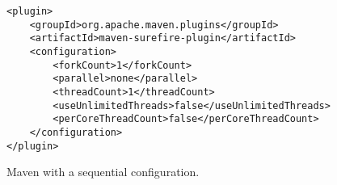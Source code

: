 
\begin{figure}[h!]
\centering
\tiny
{}
\begin{lstlisting}
<plugin>
    <groupId>org.apache.maven.plugins</groupId>
    <artifactId>maven-surefire-plugin</artifactId>
    <configuration>
        <forkCount>1</forkCount>
        <parallel>none</parallel>
        <threadCount>1</threadCount>
        <useUnlimitedThreads>false</useUnlimitedThreads>
        <perCoreThreadCount>false</perCoreThreadCount>
    </configuration>
</plugin>
\end{lstlisting}
    \caption{\label{fig:surefire-configuration}  Maven with a sequential
    configuration.}
\end{figure}
